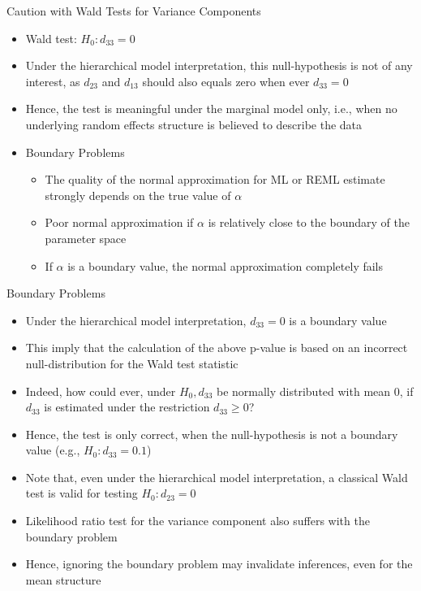 \documentclass{beamer}
\begin{document}
\begin{frame}{Caution with Wald Tests for Variance Components}
\begin{itemize}
	\item Wald test: $H_0:d_{33}=0$
	\item Under the hierarchical model interpretation, this null-hypothesis is not of any interest, as $d_{23}$ and $d_{13}$ should also equals zero when ever $d_{33}=0$
	\item Hence, the test is meaningful under the marginal model only, i.e., when no underlying random effects structure is believed to describe the data
	\item Boundary Problems
	\begin{itemize}
		\item The quality of the normal approximation for ML or REML estimate strongly depends on the true value of $\alpha$
		\item Poor normal approximation if $\alpha$ is relatively close to the boundary of the parameter space
		\item If $\alpha$ is a boundary value, the normal approximation completely fails
	\end{itemize}
\end{itemize}
\end{frame}

\begin{frame}{Boundary Problems}
\begin{itemize}
	\item Under the hierarchical model interpretation, $d_{33}=0$ is a boundary value
	\item This imply  that the calculation of the above p-value is based on an incorrect null-distribution for the Wald test statistic
	\item Indeed, how could ever, under $H_0, d_{33}$ be normally distributed with mean 0, if $d_{33}$ is estimated under the restriction $d_{33}\ge 0$?
	\item Hence, the test is only correct, when the null-hypothesis is not a boundary value (e.g., $H_0 : d_{33}=0.1$)
	\item Note that, even under the hierarchical model interpretation, a classical Wald test is valid for testing $H_0 : d_{23}=0$
	\item Likelihood ratio test for the variance component also suffers with the boundary problem
	\item Hence, ignoring the boundary problem may invalidate inferences, even for the mean structure
\end{itemize}
\end{frame}
\end{document}
